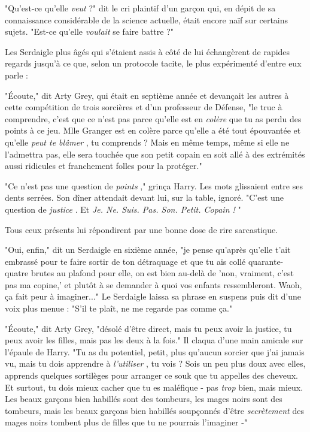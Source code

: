 "Qu'est-ce qu'elle \emph{veut}  ?" dit le cri plaintif d'un garçon qui, en dépit de sa connaissance considérable de la science actuelle, était encore naïf sur certains sujets. "Est-ce qu'elle \emph{voulait}  se faire battre ?"

Les Serdaigle plus âgés qui s'étaient assis à côté de lui échangèrent de rapides regards jusqu'à ce que, selon un protocole tacite, le plus expérimenté d'entre eux parle :

"Écoute," dit Arty Grey, qui était en septième année et devançait les autres à cette compétition de trois sorcières et d'un professeur de Défense, "le truc à comprendre, c'est que ce n'est pas parce qu'elle est en \emph{colère}  que tu as perdu des points à ce jeu. Mlle Granger est en colère parce qu'elle a été tout épouvantée et qu'elle \emph{peut te blâmer} , tu comprends ? Mais en même temps, même si elle ne l'admettra pas, elle sera touchée que son petit copain en soit allé à des extrémités aussi ridicules et franchement folles pour la protéger."

"Ce n'est pas une question de \emph{points} ," grinça Harry. Les mots glissaient entre ses dents serrées. Son dîner attendait devant lui, sur la table, ignoré. "C'est une question de \emph{justice} . Et \emph{Je. Ne. Suis. Pas. Son. Petit. Copain !} "

Tous ceux présents lui répondirent par une bonne dose de rire sarcastique.

"Oui, enfin," dit un Serdaigle en sixième année, "je pense qu'après qu'elle t'ait embrassé pour te faire sortir de ton détraquage et que tu ais collé quarante-quatre brutes au plafond pour elle, on est bien au-delà de 'non, vraiment, c'est pas ma copine,' et plutôt à se demander à quoi vos enfants ressembleront. Waoh, ça fait peur à imaginer..." Le Serdaigle laissa sa phrase en suspens puis dit d'une voix plus menue : "S'il te plaît, ne me regarde pas comme ça."

"Écoute," dit Arty Grey, "désolé d'être direct, mais tu peux avoir la justice, tu peux avoir les filles, mais pas les deux à la fois." Il claqua d'une main amicale sur l'épaule de Harry. "Tu as du potentiel, petit, plus qu'aucun sorcier que j'ai jamais vu, mais tu dois apprendre à \emph{l'utiliser} , tu vois ? Sois un peu plus doux avec elles, apprends quelques sortilèges pour arranger ce souk que tu appelles des cheveux. Et surtout, tu dois mieux cacher que tu es maléfique - pas \emph{trop } bien, mais mieux. Les beaux garçons bien habillés sont des tombeurs, les mages noirs sont des tombeurs, mais les beaux garçons bien habillés soupçonnés d'être \emph{secrètement}  des mages noirs tombent plus de filles que tu ne pourrais l'imaginer -"

